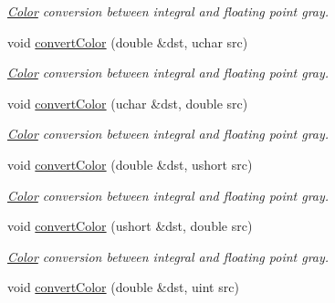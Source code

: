 \begin{DoxyCompactItemize}
\begin{DoxyCompactList}\small\item\em \hyperlink{class_d_o_1_1_color}{Color} conversion between integral and floating point gray. \end{DoxyCompactList}\item 
\hypertarget{group___color_conversion_ga0e207aa9d9aaff59a04cf01cdbf18f12}{void \hyperlink{group___color_conversion_ga0e207aa9d9aaff59a04cf01cdbf18f12}{convert\-Color} (double \&dst, uchar src)}\label{group___color_conversion_ga0e207aa9d9aaff59a04cf01cdbf18f12}

\begin{DoxyCompactList}\small\item\em \hyperlink{class_d_o_1_1_color}{Color} conversion between integral and floating point gray. \end{DoxyCompactList}\item 
\hypertarget{group___color_conversion_ga04ff77912603deeda3abebe6ccb58ec0}{void \hyperlink{group___color_conversion_ga04ff77912603deeda3abebe6ccb58ec0}{convert\-Color} (uchar \&dst, double src)}\label{group___color_conversion_ga04ff77912603deeda3abebe6ccb58ec0}

\begin{DoxyCompactList}\small\item\em \hyperlink{class_d_o_1_1_color}{Color} conversion between integral and floating point gray. \end{DoxyCompactList}\item 
\hypertarget{group___color_conversion_ga18995345fd71603c4460223a76840fc4}{void \hyperlink{group___color_conversion_ga18995345fd71603c4460223a76840fc4}{convert\-Color} (double \&dst, ushort src)}\label{group___color_conversion_ga18995345fd71603c4460223a76840fc4}

\begin{DoxyCompactList}\small\item\em \hyperlink{class_d_o_1_1_color}{Color} conversion between integral and floating point gray. \end{DoxyCompactList}\item 
\hypertarget{group___color_conversion_ga4a3e303e7f029775b76f89277d2d4ed2}{void \hyperlink{group___color_conversion_ga4a3e303e7f029775b76f89277d2d4ed2}{convert\-Color} (ushort \&dst, double src)}\label{group___color_conversion_ga4a3e303e7f029775b76f89277d2d4ed2}

\begin{DoxyCompactList}\small\item\em \hyperlink{class_d_o_1_1_color}{Color} conversion between integral and floating point gray. \end{DoxyCompactList}\item 
\hypertarget{group___color_conversion_ga9330d0d2855d6117e06138deb033ab86}{void \hyperlink{group___color_conversion_ga9330d0d2855d6117e06138deb033ab86}{convert\-Color} (double \&dst, uint src)}\label{group___color_conversion_ga9330d0d2855d6117e06138deb033ab86}


\end{DoxyCompactItemize}

